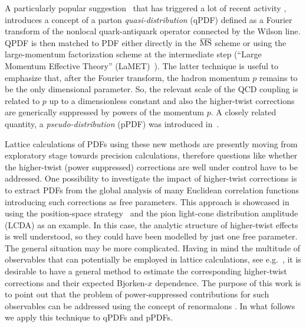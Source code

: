 \documentclass[aps,prd,twocolumn,a4paper,superscriptaddress,10pt,showpacs,notitlepage,floatfix]{revtex4-1}
\newcommand{\overbar}[1]{\mkern 1.5mu\overline{\mkern-1.5mu#1\mkern-1.5mu}\mkern 1.5mu}
\newcommand{\MSbar}{\overbar{\text{MS}}}
\begin{document}
A particularly popular suggestion~\cite{Ji:2013dva} that has triggered  a lot of recent activity \cite{Lin:2014zya,Alexandrou:2015rja,Chen:2016utp,Alexandrou:2016jqi,Lin:2017ani,Zhang:2017bzy,Chen:2017gck,Chen:2017mzz,Alexandrou:2017huk, Alexandrou:2018pbm,Chen:2018xof,Chen:2018fwa,Alexandrou:2018eet,
Lin:2018qky}, introduces a concept of a parton \emph{quasi-distribution} (qPDF) defined as a Fourier transform of the nonlocal quark-antiquark operator connected by the Wilson line. QPDF is then matched to PDF either directly in the $\MSbar$ scheme or using the large-momentum factorization scheme at the intermediate step (``Large Momentum Effective Theory'' (LaMET)~\cite{Ji:2014gla,Izubuchi:2018srq}). The latter technique is useful to emphasize that, after the Fourier transform, the hadron momentum $p$ remains to be the only dimensional parameter. So, the relevant scale of the QCD coupling is related to $p$ up to a dimensionless constant and also the higher-twist corrections are generically suppressed by powers of the momentum $p$. A closely related quantity, a \emph{pseudo-distribution} (pPDF) was introduced in~\cite{Radyushkin:2017cyf,Orginos:2017kos,Karpie:2017bzm}.
 
Lattice calculations of PDFs using these new methods are presently moving from exploratory stage towards precision calculations, therefore questions like whether the higher-twist (power suppressed) corrections are well under control have to be addressed. One possibility to investigate the impact of higher-twist corrections is to extract PDFs from the global analysis of many Euclidean correlation functions introducing 
{such} corrections as free parameters. This approach is
showcased in \cite{Bali:2018spj} using the position-space strategy~\cite{Braun:2007wv,Bali:2017gfr} 
and the pion light-cone distribution amplitude (LCDA) as an example.
%
In this case, the analytic structure of higher-twist effects is well understood, so they could have been modelled by just one free parameter.  
The general situation  may be more complicated. Having in mind the multitude of 
observables that can potentially be employed in lattice calculations, see e.g.~\cite{Ma:2017pxb}, 
it is desirable to have a general method to estimate the corresponding higher-twist corrections and their expected Bjorken-$x$ dependence.   
The purpose of this work is to point out that the problem of power-suppressed contributions for such observables 
can be addressed using the concept of renormalons \cite{Beneke:1998ui,Beneke:2000kc}. In what follows we apply this technique 
to qPDFs and pPDFs.
\end{document}
